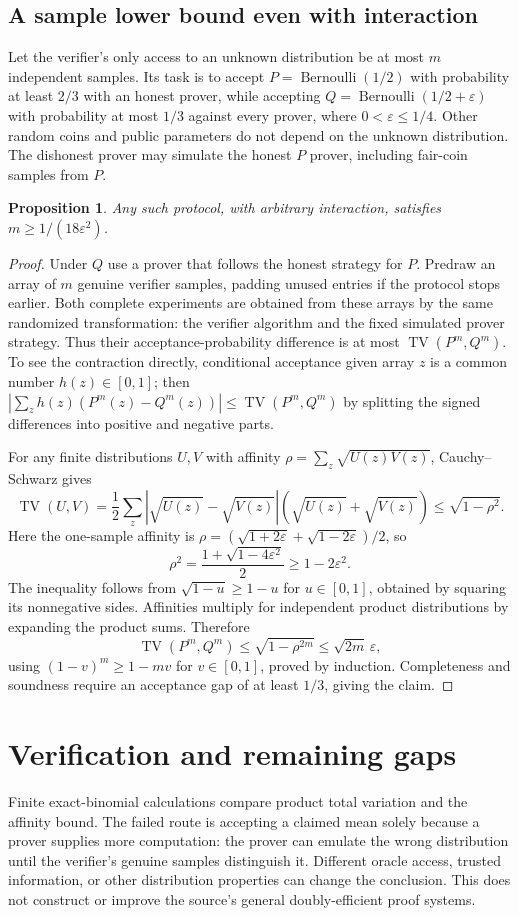 \documentclass[11pt]{article}
\newtheorem{proposition}{Proposition}
\begin{document}
\subsection{A sample lower bound even with interaction}
Let the verifier's only access to an unknown distribution be at most $m$ independent samples. Its task is to accept $P=\operatorname{Bernoulli}(1/2)$ with probability at least $2/3$ with an honest prover, while accepting $Q=\operatorname{Bernoulli}(1/2+\varepsilon)$ with probability at most $1/3$ against every prover, where $0<\varepsilon\le1/4$. Other random coins and public parameters do not depend on the unknown distribution. The dishonest prover may simulate the honest $P$ prover, including fair-coin samples from $P$.
\begin{proposition}
Any such protocol, with arbitrary interaction, satisfies $m\ge1/(18\varepsilon^2)$.
\end{proposition}
\begin{proof}
Under $Q$ use a prover that follows the honest strategy for $P$. Predraw an array of $m$ genuine verifier samples, padding unused entries if the protocol stops earlier. Both complete experiments are obtained from these arrays by the same randomized transformation: the verifier algorithm and the fixed simulated prover strategy. Thus their acceptance-probability difference is at most $\operatorname{TV}(P^m,Q^m)$. To see the contraction directly, conditional acceptance given array $z$ is a common number $h(z)\in[0,1]$; then $|\sum_z h(z)(P^m(z)-Q^m(z))|\le\operatorname{TV}(P^m,Q^m)$ by splitting the signed differences into positive and negative parts.

For any finite distributions $U,V$ with affinity $\rho=\sum_z\sqrt{U(z)V(z)}$, Cauchy--Schwarz gives
\[
 \operatorname{TV}(U,V)=\frac12\sum_z|\sqrt{U(z)}-\sqrt{V(z)}|(\sqrt{U(z)}+\sqrt{V(z)})\le\sqrt{1-\rho^2}.
\]
Here the one-sample affinity is $\rho=(\sqrt{1+2\varepsilon}+\sqrt{1-2\varepsilon})/2$, so
\[
 \rho^2=\frac{1+\sqrt{1-4\varepsilon^2}}2\ge1-2\varepsilon^2.
\]
The inequality follows from $\sqrt{1-u}\ge1-u$ for $u\in[0,1]$, obtained by squaring its nonnegative sides. Affinities multiply for independent product distributions by expanding the product sums. Therefore
\[
 \operatorname{TV}(P^m,Q^m)\le\sqrt{1-\rho^{2m}}\le\sqrt{2m}\,\varepsilon,
\]
using $(1-v)^m\ge1-mv$ for $v\in[0,1]$, proved by induction. Completeness and soundness require an acceptance gap of at least $1/3$, giving the claim.
\end{proof}
\section{Verification and remaining gaps}
Finite exact-binomial calculations compare product total variation and the affinity bound. The failed route is accepting a claimed mean solely because a prover supplies more computation: the prover can emulate the wrong distribution until the verifier's genuine samples distinguish it. Different oracle access, trusted information, or other distribution properties can change the conclusion. This does not construct or improve the source's general doubly-efficient proof systems.
\end{document}
